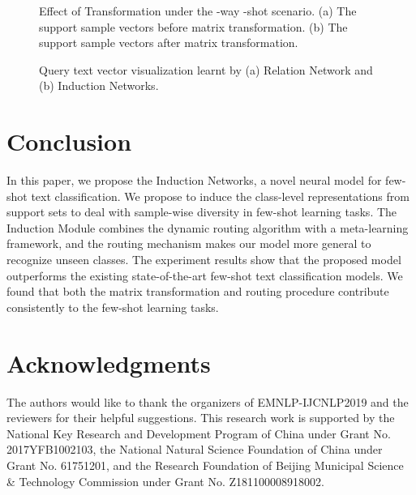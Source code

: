 \documentclass[11pt,a4paper]{article}
\begin{document}
\begin{figure}
    \centering
{}
\caption{Effect of Transformation under the -way -shot scenario. (a) The support sample vectors before matrix transformation. (b) The support sample vectors after matrix transformation.}
    \label{fig:transformation}
\end{figure}



\begin{figure}
    \centering
{}
\caption{Query text vector visualization learnt by (a) Relation Network and (b) Induction Networks.}
    \label{fig:sandian_cmp}
\end{figure}



\section{Conclusion}
In this paper, we propose the Induction Networks, a novel neural model for few-shot text classification. We propose to induce the class-level representations from support sets to deal with sample-wise diversity in few-shot learning tasks. The Induction Module combines the dynamic routing algorithm with a meta-learning framework, and the routing mechanism makes our model more general to recognize unseen classes.
The experiment results show that the proposed model outperforms the existing state-of-the-art few-shot text classification models. We found that both the matrix transformation and routing procedure contribute consistently to the few-shot learning tasks.
\section*{Acknowledgments}
The authors would like to thank the organizers of EMNLP-IJCNLP2019 and the reviewers for their helpful suggestions. This research work is supported by the National Key Research and Development Program of China under Grant No. 2017YFB1002103, the National Natural Science Foundation of China under Grant No. 61751201, and the Research Foundation of Beijing Municipal Science \& Technology Commission under Grant No. Z181100008918002.



\end{document}
